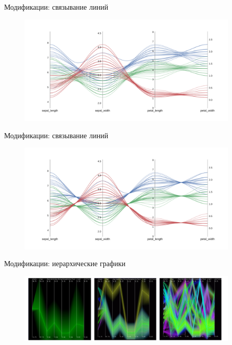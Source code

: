 \documentclass[fleqn, xcolor=x11names]{beamer}
\begin{document}
\begin{frame}{Модификации: связывание линий}
    \begin{figure}[htb]
        \centering
        \includegraphics[width=10.5cm]{bundle_0.3_pc.pdf}
    \end{figure}
\end{frame}

\begin{frame}{Модификации: связывание линий}
    \begin{figure}[htb]
        \centering
        \includegraphics[width=10.5cm]{bundle_0.01_pc.pdf}
    \end{figure}
\end{frame}

\begin{frame}{Модификации: иерархические графики}
    \begin{figure}[htb]
        \centering
        \includegraphics[width=10.5cm]{hierarchical.png}
    \end{figure}
\end{frame}
\end{document}
